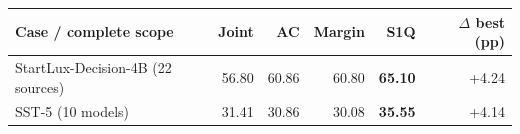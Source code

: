 \begin{tabular}{lrrrrr}
\toprule
Case / complete scope & Joint & AC & Margin & S1Q & $\Delta$ best (pp) \\
\midrule
StartLux-Decision-4B (22 sources) & 56.80 & 60.86 & 60.80 & \textbf{65.10} & +4.24 \\
SST-5 (10 models) & 31.41 & 30.86 & 30.08 & \textbf{35.55} & +4.14 \\
\bottomrule
\end{tabular}
